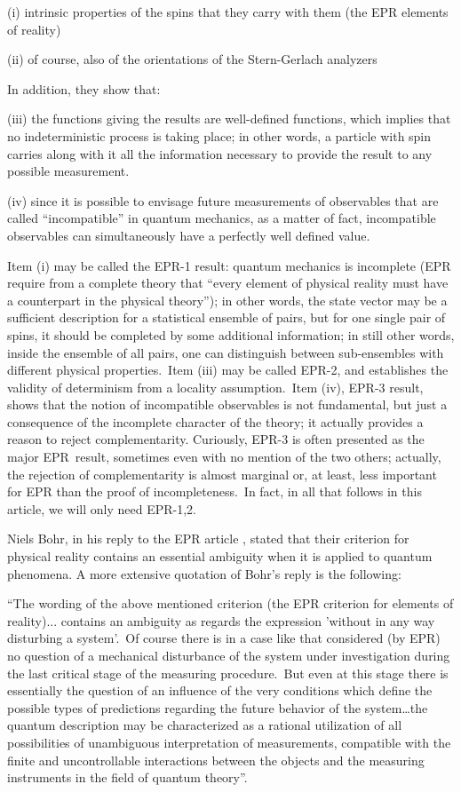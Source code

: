 \documentclass[12pt,onecolumn]{article}%
\begin{document}
(i) intrinsic properties of the spins that they carry with them (the EPR
elements of reality)

(ii) of course, also of the orientations of the Stern-Gerlach analyzers

In addition, they show that:

(iii) the functions giving the results are well-defined functions, which
implies that no indeterministic process is taking place; in other words, a
particle with spin carries along with it all the information necessary to
provide the result to any possible measurement.

(iv) since it is possible to envisage future measurements of observables that
are called ``incompatible'' in quantum mechanics, as a matter of fact,
incompatible observables can simultaneously have a perfectly well defined value.

Item (i) may be called the EPR-1 result: quantum mechanics is incomplete (EPR
require from a complete theory that ``every element of physical reality must
have a counterpart in the physical theory''); in other words, the state vector
may be a sufficient description for a statistical ensemble of pairs, but for
one single pair of spins, it should be completed by some additional
information; in still other words, inside the ensemble of all pairs, one can
distinguish between sub-ensembles with different physical properties.\ Item
(iii) may be called EPR-2, and establishes the validity of determinism from a
locality assumption.\ Item (iv), EPR-3 result, shows that the notion of
incompatible observables is not fundamental, but just a consequence of the
incomplete character of the theory; it actually provides a reason to reject
complementarity. Curiously, EPR-3 is often presented as the major EPR\ result,
sometimes even with no mention of the two others; actually, the rejection of
complementarity is almost marginal or, at least, less important for EPR than
the proof of incompleteness.\ In fact, in all that follows in this article, we
will only need EPR-1,2.

Niels Bohr, in his reply to the EPR article \cite{Bohr-EPR}, stated that their
criterion for physical reality contains an essential ambiguity when it is
applied to quantum phenomena. A more extensive quotation of Bohr's reply is
the following:

``The wording of the above mentioned criterion (the EPR criterion for elements
of reality)... contains an ambiguity as regards the expression 'without in any
way disturbing a system'.\ Of course there is in a case like that considered
(by EPR) no question of a mechanical disturbance of the system under
investigation during the last critical stage of the measuring procedure.\ But
even at this stage there is essentially the question of an influence of the
very conditions which define the possible types of predictions regarding the
future behavior of the system\ldots  the quantum description may be characterized
as a rational utilization of all possibilities of unambiguous interpretation
of measurements, compatible with the finite and uncontrollable interactions
between the objects and the measuring instruments in the field of quantum theory''.
\end{document}
